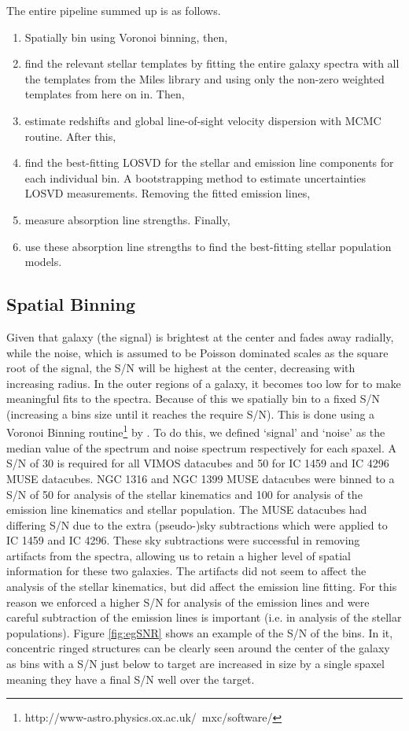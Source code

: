 	The entire pipeline summed up is as follows.
	\begin{enumerate}
		\item Spatially bin using Voronoi binning, then,
		\item find the relevant stellar templates by fitting the entire galaxy spectra with all the templates from the Miles library and using only the non-zero weighted templates from here on in. Then,
		\item estimate redshifts and global line-of-sight velocity dispersion with MCMC routine. After this,
		\item find the best-fitting LOSVD for the stellar and emission line components for each individual bin. A bootstrapping method to estimate uncertainties LOSVD measurements. Removing the fitted emission lines,
		\item measure absorption line strengths. Finally, 
		\item use these absorption line strengths to find the best-fitting stellar population models.
	\end{enumerate}


	\subsection{Spatial Binning}
		\label{subsec:Binning}
		Given that galaxy (the signal) is brightest at the center and fades away radially, while the noise, which is assumed to be Poisson dominated scales as the square root of the signal, the S/N will be highest at the center, decreasing with increasing radius. In the outer regions of a galaxy, it becomes too low for to make meaningful fits to the spectra. Because of this we spatially bin to a fixed S/N (increasing a bins size until it reaches the require S/N). This is done using a Voronoi Binning routine\footnote{http://www-astro.physics.ox.ac.uk/~mxc/software/} by \citet{Cappellari2003}. To do this, we defined `signal' and `noise' as the median value of the spectrum and noise spectrum respectively for each spaxel. A S/N of 30 is required for all VIMOS datacubes and 50 for IC 1459 and IC 4296 MUSE datacubes. NGC 1316 and NGC 1399 MUSE datacubes were binned to a S/N of 50 for analysis of the stellar kinematics and 100 for analysis of the emission line kinematics and stellar population. The MUSE datacubes had differing S/N due to the extra (pseudo-)sky subtractions which were applied to IC 1459 and IC 4296. These sky subtractions were successful in removing artifacts from the spectra, allowing us to retain a higher level of spatial information for these two galaxies. The artifacts did not seem to affect the analysis of the stellar kinematics, but did affect the emission line fitting. For this reason we enforced a higher S/N for analysis of the emission lines and were careful subtraction of the emission lines is important (i.e. in analysis of the stellar populations). Figure \ref{fig:egSNR} shows an example of the S/N of the bins. In it, concentric ringed structures can be clearly seen around the center of the galaxy as bins with a S/N just below to target are increased in size by a single spaxel meaning they have a final S/N well over the target.

